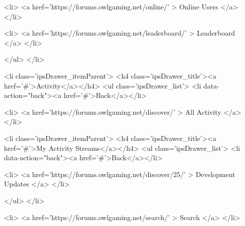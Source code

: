 	
		
			<li>
				<a href='https://forums.owlgaming.net/online/' >
					Online Users
				</a>
			</li>
		
	

	
		
			<li>
				<a href='https://forums.owlgaming.net/leaderboard/' >
					Leaderboard
				</a>
			</li>
		
	

										
								</ul>
							</li>
						
					
				
					
						
						
							<li class='ipsDrawer_itemParent'>
								<h4 class='ipsDrawer_title'><a href='#'>Activity</a></h4>
								<ul class='ipsDrawer_list'>
									<li data-action="back"><a href='#'>Back</a></li>
									
									
										
										
										
											
												
													
													
									
													
									
									
									
										


	
		
			<li>
				<a href='https://forums.owlgaming.net/discover/' >
					All Activity
				</a>
			</li>
		
	

	
		
			
			<li class='ipsDrawer_itemParent'>
				<h4 class='ipsDrawer_title'><a href='#'>My Activity Streams</a></h4>
				<ul class='ipsDrawer_list'>
					<li data-action="back"><a href='#'>Back</a></li>
					
					


	
		
			<li>
				<a href='https://forums.owlgaming.net/discover/25/' >
					Development Updates
				</a>
			</li>
		
	

				</ul>
			</li>
		
	

	

	

	
		
			<li>
				<a href='https://forums.owlgaming.net/search/' >
					Search
				</a>
			</li>
		
	

